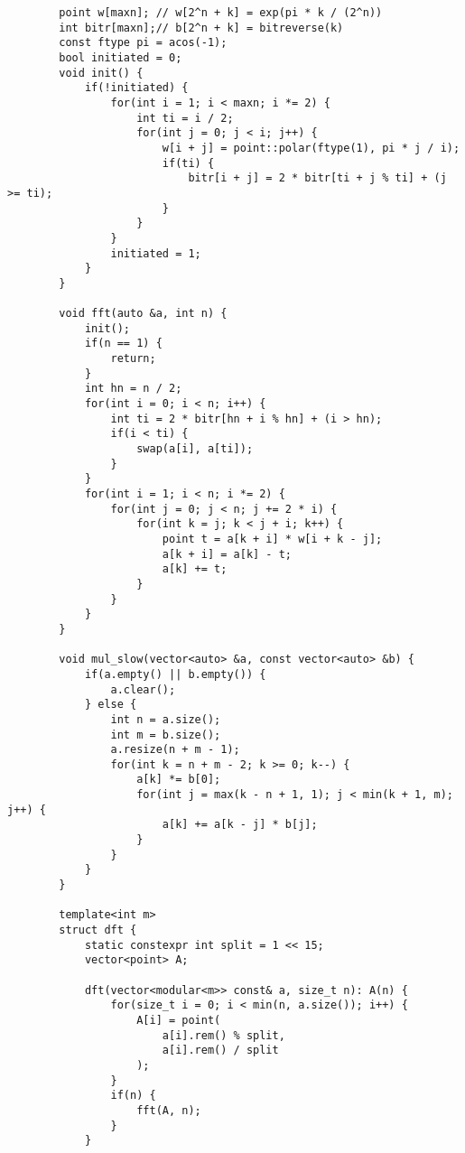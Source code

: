\begin{lstlisting}
        point w[maxn]; // w[2^n + k] = exp(pi * k / (2^n))
        int bitr[maxn];// b[2^n + k] = bitreverse(k)
        const ftype pi = acos(-1);
        bool initiated = 0;
        void init() {
            if(!initiated) {
                for(int i = 1; i < maxn; i *= 2) {
                    int ti = i / 2;
                    for(int j = 0; j < i; j++) {
                        w[i + j] = point::polar(ftype(1), pi * j / i);
                        if(ti) {
                            bitr[i + j] = 2 * bitr[ti + j % ti] + (j >= ti);
                        }
                    }
                }
                initiated = 1;
            }
        }
        
        void fft(auto &a, int n) {
            init();
            if(n == 1) {
                return;
            }
            int hn = n / 2;
            for(int i = 0; i < n; i++) {
                int ti = 2 * bitr[hn + i % hn] + (i > hn);
                if(i < ti) {
                    swap(a[i], a[ti]);
                }
            }
            for(int i = 1; i < n; i *= 2) {
                for(int j = 0; j < n; j += 2 * i) {
                    for(int k = j; k < j + i; k++) {
                        point t = a[k + i] * w[i + k - j];
                        a[k + i] = a[k] - t;
                        a[k] += t;
                    }
                }
            }
        }
        
        void mul_slow(vector<auto> &a, const vector<auto> &b) {
            if(a.empty() || b.empty()) {
                a.clear();
            } else {
                int n = a.size();
                int m = b.size();
                a.resize(n + m - 1);
                for(int k = n + m - 2; k >= 0; k--) {
                    a[k] *= b[0];
                    for(int j = max(k - n + 1, 1); j < min(k + 1, m); j++) {
                        a[k] += a[k - j] * b[j];
                    }
                }
            }
        }
        
        template<int m>
        struct dft {
            static constexpr int split = 1 << 15;
            vector<point> A;
            
            dft(vector<modular<m>> const& a, size_t n): A(n) {
                for(size_t i = 0; i < min(n, a.size()); i++) {
                    A[i] = point(
                        a[i].rem() % split,
                        a[i].rem() / split
                    );
                }
                if(n) {
                    fft(A, n);
                }
            }
        

\end{lstlisting}
